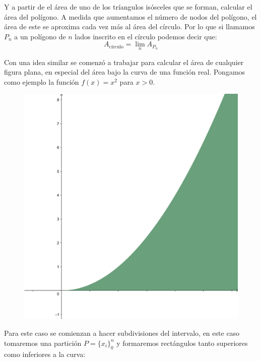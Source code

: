 \documentclass{article}
\begin{document}
Y a partir de el área de uno de los tríangulos isósceles que se forman, calcular el área del polígono. A medida que aumentamos el número de nodos del polígono, el área de este se aproxima cada vez más al área del círculo. Por lo que si llamamos $P_n$ a un polígono de $n$ lados inscrito en el círculo podemos decir que:
$$A_{\text{círculo}}=\lim_n A_{P_n} $$

Con una idea similar se comenzó a trabajar para calcular el área de cualquier figura plana, en especial del área bajo la curva de una función real. Pongamos como ejemplo la función $f(x)=x^2$ para $x>0$.
\begin{figure}[h!]
	\centering
	\includegraphics[scale=2]{img/fig3.png}
	\label{fig:2}
\end{figure}
\newpage
Para este caso se comienzan a hacer subdivisiones del intervalo, en este caso tomaremos una partición $\displaystyle P=\{x_i\}_0^{n}$ y formaremos rectángulos tanto superiores como inferiores a la curva:
\end{document}
